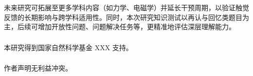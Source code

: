\documentclass[runningheads]{llncs}
\begin{document}
未来研究可拓展至更多学科内容（如力学、电磁学）并延长干预周期，以验证触觉反馈的长期影响与跨学科适用性。同时，本次研究知识测试以再认与回忆类题目为主，后续可增加开放性问题、问题解决任务等，更精准地评估深层理解能力。

\begin{credits}
\subsubsection{\ackname} 
本研究得到国家自然科学基金 XXX 
支持。

\subsubsection{\discintname}
作者声明无利益冲突。
\end{credits}


\end{document}
